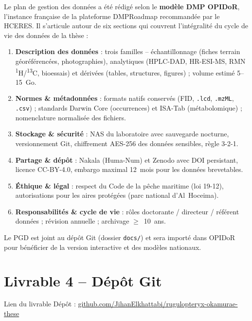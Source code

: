 \documentclass[11pt,a4paper]{article}
\begin{document}
Le plan de gestion des données a été rédigé selon le \textbf{modèle DMP OPIDoR},
l'instance française de la plateforme DMPRoadmap recommandée par le HCERES. Il
s'articule autour de six sections qui couvrent l'intégralité du cycle de vie des
données de la thèse :

\begin{enumerate}[leftmargin=1.5em, itemsep=1pt]
  \item \textbf{Description des données} : trois familles -- échantillonnage
        (fiches terrain géoréférencées, photographies), analytiques (HPLC-DAD,
        HR-ESI-MS, RMN \textsuperscript{1}H/\textsuperscript{13}C, bioessais) et
        dérivées (tables, structures, figures) ; volume estimé 5--15~Go.
  \item \textbf{Normes \& métadonnées} : formats natifs conservés (FID, \texttt{.lcd},
        \texttt{.mzML}, \texttt{.csv}) ; standards Darwin Core (occurrences) et ISA-Tab
        (métabolomique) ; nomenclature normalisée des fichiers.
  \item \textbf{Stockage \& sécurité} : NAS du laboratoire avec sauvegarde nocturne,
        versionnement Git, chiffrement AES-256 des données sensibles, règle 3-2-1.
  \item \textbf{Partage \& dépôt} : Nakala (Huma-Num) et Zenodo avec DOI persistant,
        licence CC-BY-4.0, embargo maximal 12~mois pour les données brevetables.
  \item \textbf{Éthique \& légal} : respect du Code de la pêche maritime (loi 19-12),
        autorisations pour les aires protégées (parc national d'Al~Hoceima).
  \item \textbf{Responsabilités \& cycle de vie} : rôles doctorante / directeur /
        référent données ; révision annuelle ; archivage $\geq$~10~ans.
\end{enumerate}

Le PGD est joint au dépôt Git (dossier \texttt{docs/}) et sera importé dans OPIDoR
pour bénéficier de la version interactive et des modèles nationaux.

\section{Livrable 4 -- Dépôt Git}
\begin{lienbox}{Lien du livrable}
Dépôt :
\href{https://github.com/JihanElkhattabi/rugulopteryx-okamurae-these}{github.com/JihanElkhattabi/rugulopteryx-okamurae-these}
\end{lienbox}
\end{document}
